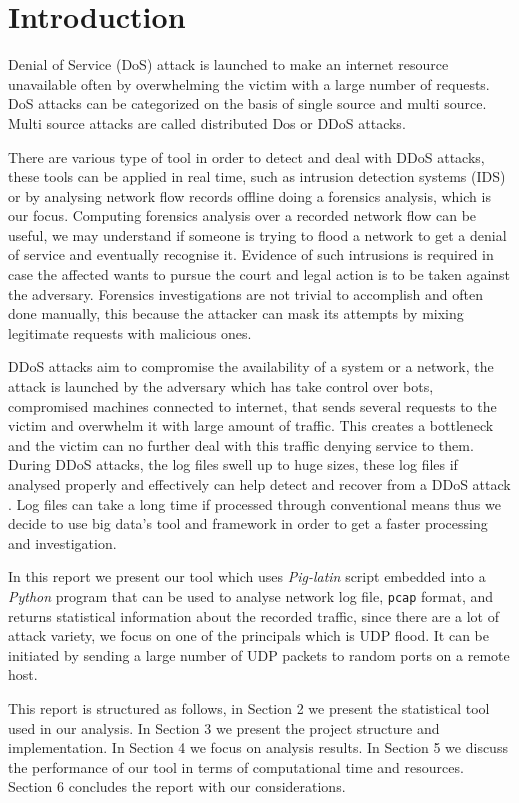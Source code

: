 \section{Introduction}
Denial of Service (DoS) attack is launched to make an internet resource unavailable often by overwhelming the victim with a large number of requests. DoS attacks can be categorized on the basis of single source and multi source. Multi source attacks are called distributed Dos or DDoS attacks\cite{ddos_forensics}.
 
There are various type of tool in order to detect and deal with DDoS attacks, these tools can be applied in real time, such as intrusion detection systems (IDS) or by analysing network flow records offline doing a forensics analysis, which is our focus.
Computing forensics analysis over a recorded network flow can be useful, we may understand if someone is trying to flood a network to get a denial of service and eventually recognise it.
Evidence of such intrusions is required in case the affected wants to pursue the court and legal action is to be taken against the adversary.
Forensics investigations are not trivial to accomplish and often done manually, this because the attacker can mask its attempts by mixing legitimate requests with malicious ones.

DDoS attacks aim to compromise the availability of a system or a network, the attack is launched by the adversary which has take control over bots, compromised machines connected to internet, that sends several requests to the victim and overwhelm it with large amount of traffic. This creates a bottleneck and the victim can no further deal with this traffic denying service to them.
During DDoS attacks, the log files swell up to huge sizes, these log files if analysed properly and effectively can help detect and recover from a DDoS attack \cite{ddos_forensics}. Log files can take a long time if processed through conventional means thus we decide to use big data's tool and framework in order to get a faster processing and investigation.

In this report we present our tool which uses \textit{Pig-latin} script embedded into a \textit{Python} program that can be used to analyse network log file, \texttt{pcap} format\cite{wireshrk_pcap}, and returns statistical information about the recorded traffic, since there are a lot of attack variety, we focus on one of the principals which is UDP flood. 
It can be initiated by sending a large number of UDP packets to random ports on a remote host.

This report is structured as follows, in Section 2 we present the statistical tool used in our analysis. In Section 3 we present the project structure and implementation. In Section 4 we focus on analysis results. In Section 5 we discuss the performance of our tool in terms of computational time and resources. Section 6 concludes the report with our considerations.  